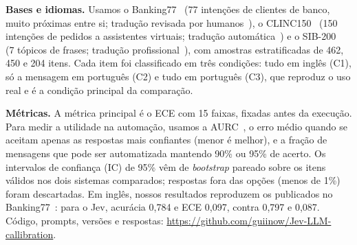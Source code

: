 \documentclass[sigconf,nonacm]{acmart}
\begin{document}
\textbf{Bases e idiomas.} Usamos o Banking77~\cite{casanueva2020banking77} (77 intenções de clientes de banco, muito próximas entre si; tradução revisada por humanos~\cite{dimant2025banking77pt}), o CLINC150~\cite{larson2019clinc} (150 intenções de pedidos a assistentes virtuais; tradução automática~\cite{tech4humans_clinc_pt}) e o SIB-200~\cite{adelani2024sib} (7 tópicos de frases; tradução profissional~\cite{nllb2022}), com amostras estratificadas de 462, 450 e 204 itens. Cada item foi classificado em três condições: tudo em inglês (C1), só a mensagem em português (C2) e tudo em português (C3), que reproduz o uso real e é a condição principal da comparação.

\textbf{Métricas.} A métrica principal é o ECE com 15 faixas, fixadas antes da execução. Para medir a utilidade na automação, usamos a AURC~\cite{geifman2017selective}, o erro médio quando se aceitam apenas as respostas mais confiantes (menor é melhor), e a fração de mensagens que pode ser automatizada mantendo 90\% ou 95\% de acerto. Os intervalos de confiança (IC) de 95\% vêm de \emph{bootstrap} pareado sobre os itens válidos nos dois sistemas comparados; respostas fora das opções (menos de 1\%) foram descartadas. Em inglês, nossos resultados reproduzem os publicados no Banking77~\cite{deusser2026jev}: para o Jev, acurácia 0,784 e ECE 0,097, contra 0,797 e 0,087. Código, prompts, versões e respostas: \url{https://github.com/guiinow/Jev-LLM-callibration}.
\end{document}
